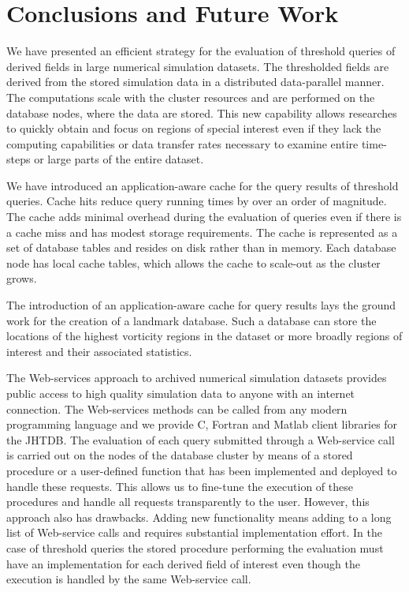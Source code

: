 \documentclass{sig-alternate}
\begin{document}
\section{Conclusions and Future Work}

We have presented an efficient strategy for the evaluation of threshold queries of derived fields in large numerical simulation datasets. 
The thresholded fields are derived from the stored simulation data in a distributed data-parallel manner. The computations
scale with the cluster resources and are performed on the database nodes, where the data are stored. This new capability allows researches to quickly
obtain and focus on regions of special interest even if they lack the computing capabilities or data transfer rates necessary to examine entire time-steps
or large parts of the entire dataset. 

We have introduced an application-aware cache for the query results of threshold queries. Cache hits reduce query running times by over an order of
magnitude. The cache adds minimal overhead during the evaluation of queries even if there is
a cache miss and has modest storage requirements. The cache is represented as a set of database tables and resides on disk rather than in memory. 
Each database node has local cache tables, which allows the cache to scale-out as the cluster grows.

The introduction of an application-aware cache for query results lays the ground work for the creation of a landmark database. Such a database can store the 
locations of the highest vorticity regions in the dataset or more broadly regions of interest and their associated statistics.

The Web-services approach to archived numerical simulation datasets provides public access to high quality simulation data to anyone with an internet
connection. The Web-services methods can be called from any modern programming language and we provide C, Fortran and Matlab client libraries for the
JHTDB. The evaluation of each query submitted through a Web-service call is carried out on the nodes of the database cluster by means of a stored
procedure
or a user-defined function that has been implemented and deployed to handle these requests. This allows us to fine-tune the execution of these procedures
and handle all requests transparently to the user. However, this approach also has drawbacks. Adding new functionality means adding to a long list of 
Web-service calls and requires substantial implementation effort. In the case of threshold queries the stored procedure performing the evaluation must have
an implementation for each derived field of interest even though the execution is handled by the same Web-service call. 
\end{document}
